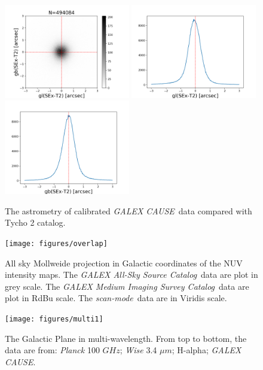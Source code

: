 \documentclass[12pt, preprint]{aastex61}
\newcommand{\project}[1]{\textsl{#1}}
\newcommand{\asc}{\project{GALEX All-Sky Source Catalog}}
\newcommand{\msc}{\project{GALEX Medium Imaging Survey Catalog}}
\newcommand{\cause}{\project{GALEX CAUSE}}
\newcommand{\scanmode}{\project{scan-mode}}
\begin{document}
\begin{figure}[p]
\begin{center}
\includegraphics[width=0.49\textwidth]{figures/astrometry}
\includegraphics[width=0.49\textwidth]{figures/astrometry_gl}
\includegraphics[width=0.49\textwidth]{figures/astrometry_gb}
\end{center}
\caption{
  \label{map5}
  The astrometry of calibrated \cause\ data compared with Tycho 2 catalog. 
}
\end{figure}

\begin{figure}[p]
\begin{center}
\texttt{[image: figures/overlap]}
\end{center}
\caption{
  \label{map3}
  All sky Mollweide projection in Galactic coordinates of the NUV intensity maps.
  The \asc\ data are plot in grey scale.
  The \msc\ data are plot in RdBu scale.
  The \scanmode\ data are in Viridis scale. 
}
\end{figure}

\begin{figure}[p]
\begin{center}
\texttt{[image: figures/multi1]}
\end{center}
\caption{
  \label{map4}
  The Galactic Plane in multi-wavelength. From top to bottom, the data are from:
  \project{Planck} 100 $GHz$; \project{Wise} 3.4 $\mu m$; H-alpha; \cause.
}
\end{figure}
\end{document}
